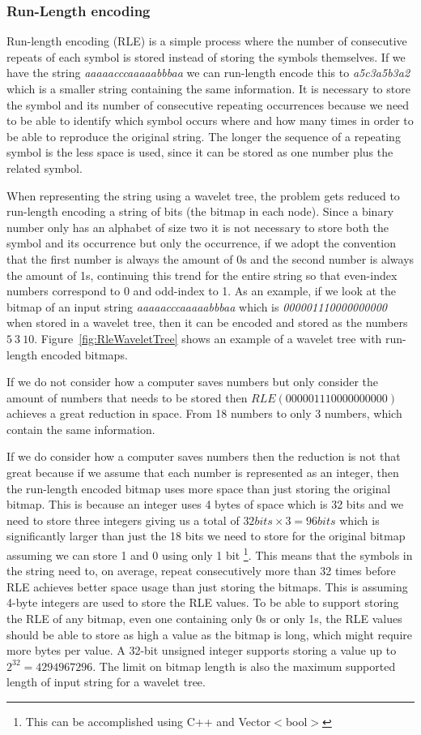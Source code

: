 \subsubsection{Run-Length encoding}
Run-length encoding (RLE) is a simple process where the number of consecutive repeats of each symbol is stored instead of storing the symbols themselves. 
If we have the string \textit{aaaaacccaaaaabbbaa} we can run-length encode this to \textit{a5c3a5b3a2} which is a smaller string containing the same information.
It is necessary to store the symbol and its number of consecutive repeating occurrences because we need to be able to identify which symbol occurs where and how many times in order to be able to reproduce the original string.
The longer the sequence of a repeating symbol is the less space is used, since it can be stored as one number plus the related symbol.

When representing the string using a wavelet tree, the problem gets reduced to run-length encoding a string of bits (the bitmap in each node).
Since a binary number only has an alphabet of size two it is not necessary to store both the symbol and its occurrence but only the occurrence, if we adopt the convention that the first number is always the amount of 0s and the second number is always the amount of 1s, continuing this trend for the entire string so that even-index numbers correspond to 0 and odd-index to 1. 
As an example, if we look at the bitmap of an input string \textit{aaaaacccaaaaabbbaa} which is \textit{000001110000000000} when stored in a wavelet tree, then it can be encoded and stored as the numbers $5~3~10$.
Figure~\ref{fig:RleWaveletTree} shows an example of a wavelet tree with run-length encoded bitmaps.

If we do not consider how a computer saves numbers but only consider the amount of numbers that needs to be stored then $RLE(000001110000000000)$ achieves a great reduction in space.
From 18 numbers to only 3 numbers, which contain the same information.

If we do consider how a computer saves numbers then the reduction is not that great because if we assume that each number is represented as an integer, then the run-length encoded bitmap uses more space than just storing the original bitmap. 
This is because an integer uses 4 bytes of space which is 32 bits and we need to store three integers giving us a total of $32 bits \times 3 = 96 bits$ which is significantly larger than just the 18 bits we need to store for the original bitmap assuming we can store 1 and 0 using only 1 bit \footnote{This can be accomplished using C++ and Vector$<$bool$>$}. 
This means that the symbols in the string need to, on average, repeat consecutively more than 32 times before RLE achieves better space usage than just storing the bitmaps.
This is assuming 4-byte integers are used to store the RLE values. 
To be able to support storing the RLE of any bitmap, even one containing only 0s or only 1s, the RLE values should be able to store as high a value as the bitmap is long, which might require more bytes per value.
A 32-bit unsigned integer supports storing a value up to $2^{32} = \num{4294967296}$. 
The limit on bitmap length is also the maximum supported length of input string for a wavelet tree.

